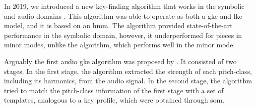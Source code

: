 


In 2019, we introduced a new key-finding algorithm that
works in the symbolic and audio domains
\parencite{napoleslopez2019keyfinding}. This algorithm was
able to operate as both a \gls{gke} and \gls{lke} model, and
it is based on an \gls{hmm}. The algorithm provided
state-of-the-art performance in the symbolic domain,
however, it underperformed for pieces in minor modes, unlike
the \textcite{albrecht2013use} algorithm, which performs
well in the minor mode.





Arguably the first audio \gls{gke} algorithm was proposed by
\textcite{leman1992een}. It consisted of two stages. In the
first stage, the algorithm extracted the strength of each
pitch-class, including its harmonics, from the audio signal.
In the second stage, the algorithm tried to match the
pitch-class information of the first stage with a set of
templates, analogous to a key profile, which were obtained
through \acrfull{som}.



